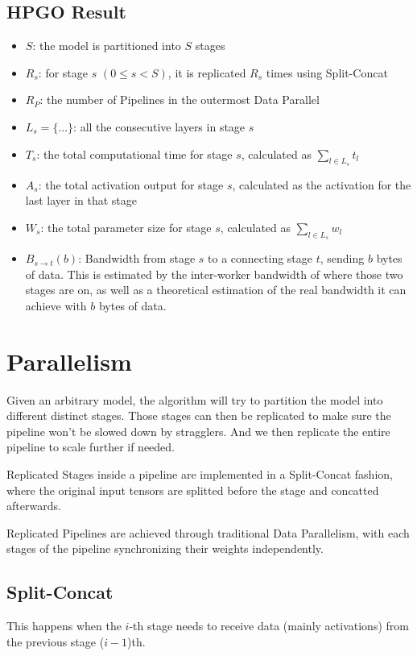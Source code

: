 \documentclass[12pt,letterpaper]{article}
\begin{document}
\subsection {HPGO Result}
\begin{itemize}
	\item $S$: the model is partitioned into $S$ stages
	\item $R_s$: for stage $s$  $(0 \le s < S)$, it is replicated $R_s$ times using Split-Concat
	\item $R_P$: the number of Pipelines in the outermost Data Parallel
	\item $L_s = \{...\}$: all the consecutive layers in stage $s$
	\item $T_s$: the total computational time for stage $s$, calculated as $\sum_{l \in L_s} {t_l}$
	\item $A_s$: the total activation output for stage $s$, calculated as the activation for the last layer in that stage
	\item $W_s$: the total parameter size for stage $s$, calculated as $\sum_{l \in L_s} w_l$
	\item $B_{s \rightarrow t}(b)$: Bandwidth from stage $s$ to a connecting stage $t$, sending $b$ bytes of data. This is estimated by the inter-worker bandwidth of where those two stages are on, as well as a theoretical estimation of the real bandwidth it can achieve with $b$ bytes of data.

\end{itemize}

\section {Parallelism}
Given an arbitrary model, the algorithm will try to partition the model into different distinct stages. Those stages can then be replicated to make sure the pipeline won't be slowed down by stragglers. And we then replicate the entire pipeline to scale further if needed. 

Replicated Stages inside a pipeline are implemented in a Split-Concat fashion, where the original input tensors are splitted before the stage and concatted afterwards. 

Replicated Pipelines are achieved through traditional Data Parallelism, with each stages of the pipeline synchronizing their weights independently.

\subsection {Split-Concat}
This happens when the $i$-th stage needs to receive data (mainly activations) from the previous stage ($i-1$)th. 
\end{document}
